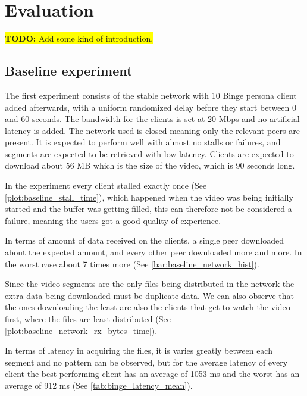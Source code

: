 \chapter{Evaluation}
\label{cha:evaluation}

\colorbox{yellow}{\textbf{TODO:} Add some kind of introduction.}


\section{Baseline experiment}    
The first experiment consists of the stable network with 10 Binge persona client added afterwards, with a uniform randomized delay before they start between 0 and 60 seconds. The bandwidth for the clients is set at 20 \ac{Mbps} and no artificial latency is added. The network used is closed meaning only the relevant peers are present. It is expected to perform well with almost no stalls or failures, and segments are expected to be retrieved with low latency. Clients are expected to download about 56 \ac{MB} which is the size of the video, which is 90 seconds long.

In the experiment every client stalled exactly once (See \autoref{plot:baseline_stall_time}), which happened when the video was being initially started and the buffer was getting filled, this can therefore not be considered a failure, meaning the users got a good quality of experience.



In terms of amount of data received on the clients, a single peer downloaded about the expected amount, and every other peer downloaded more and more. In the worst case about 7 times more (See \autoref{bar:baseline_network_hist}).



Since the video segments are the only files being distributed in the network the extra data being downloaded must be duplicate data. We can also observe that the ones downloading the least are also the clients that get to watch the video first, where the files are least distributed (See \autoref{plot:baseline_network_rx_bytes_time}).



In terms of latency in acquiring the files, it is varies greatly between each segment and no pattern can be observed, but for the average latency of every client the best performing client has an average of 1053 \acs{ms} and the worst has an average of 912 \acs{ms} (See \autoref{tab:binge_latency_mean}).

